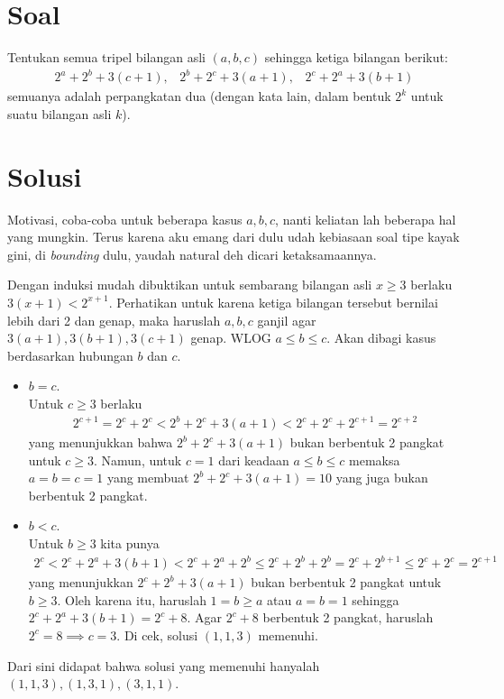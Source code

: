 \section{Soal}
Tentukan semua tripel bilangan asli $(a,b,c)$ sehingga ketiga bilangan berikut:
\begin{align*}
    2^a+2^b+3(c+1), \hspace{10pt} 2^b+2^c+3(a+1), \hspace{10pt} 2^c+2^a+3(b+1)
\end{align*}
semuanya adalah perpangkatan dua (dengan kata lain, dalam bentuk $2^k$ untuk suatu bilangan asli $k$).

\section{Solusi}
\begin{remark*}
    Motivasi, coba-coba untuk beberapa kasus $a,b,c$, nanti keliatan lah beberapa hal yang mungkin. Terus karena aku emang dari dulu udah kebiasaan soal tipe kayak gini, di \textit{bounding} dulu, yaudah natural deh dicari ketaksamaannya.
\end{remark*}

    Dengan induksi mudah dibuktikan untuk sembarang bilangan asli $x \ge 3$  berlaku $3(x+1) < 2^{x+1}$. Perhatikan untuk karena ketiga bilangan tersebut bernilai lebih dari 2 dan genap, maka haruslah $a,b,c$ ganjil agar $3(a+1),3(b+1),3(c+1)$ genap.
    WLOG $a \le b \le c$. Akan dibagi kasus berdasarkan hubungan $b$ dan $c$.

    \begin{itemize}
        \item $b = c$.\\
        Untuk $c \ge 3$ berlaku
        \begin{align*}
            2^{c+1} = 2^c + 2^c < 2^b + 2^c + 3(a+1) < 2^c + 2^c +2^{c+1} = 2^{c+2}
        \end{align*}
        yang menunjukkan bahwa $2^b + 2^c + 3(a+1)$ bukan berbentuk 2 pangkat untuk $c \ge 3$. Namun, untuk $c=1$ dari keadaan $a \le b \le c$ memaksa $a=b=c=1$ yang membuat $2^b+2^c+3(a+1)=10$ yang juga bukan berbentuk 2 pangkat.

        \item $b < c$.\\
        Untuk $b \ge 3$ kita punya
        \begin{align*}
            2^{c} < 2^c + 2^a + 3(b+1) < 2^c + 2^a + 2^b \le 2^c + 2^b + 2^b = 2^c + 2^{b+1} \le 2^c + 2^c = 2^{c+1}
        \end{align*}
        yang menunjukkan $2^c + 2^b + 3(a+1)$ bukan berbentuk 2 pangkat untuk $b \ge 3$. Oleh karena itu, haruslah $1 = b \ge a$ atau $a=b=1$ sehingga $2^c+2^a+3(b+1)=2^c+8$. Agar $2^c+8$ berbentuk 2 pangkat, haruslah $2^c=8 \implies c=3$. Di cek, solusi $(1,1,3)$ memenuhi.
    \end{itemize}
    Dari sini didapat bahwa solusi yang memenuhi hanyalah $(1,1,3), (1,3,1), (3,1,1)$.